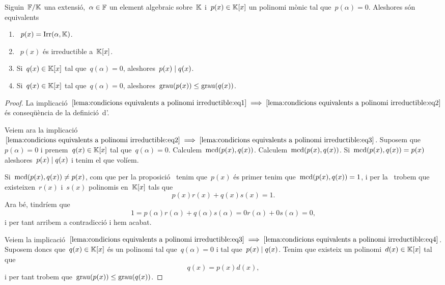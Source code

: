 \documentclass[../../main.tex]{subfiles}
\begin{document}
    \begin{lemma}
        \label{lema:condicions equivalents a polinomi irreductible}
        Siguin~\(\mathbb{F}/\mathbb{K}\) una extensió,~\(\alpha\in\mathbb{F}\) un element algebraic sobre~\(\mathbb{K}\) i~\(p(x)\in\mathbb{K}[x]\) un polinomi mònic tal que~\(p(\alpha)=0\).
        Aleshores són equivalents
        \begin{enumerate}
        \item\label{lema:condicions equivalents a polinomi irreductible:eq1}~\(p(x)=\operatorname{Irr}(\alpha,\mathbb{K})\).
        \item\label{lema:condicions equivalents a polinomi irreductible:eq2}~\(p(x)\) és irreductible a~\(\mathbb{K}[x]\).
        \item\label{lema:condicions equivalents a polinomi irreductible:eq3} Si~\(q(x)\in\mathbb{K}[x]\) tal que~\(q(\alpha)=0\), aleshores~\(p(x)\mathrel{|} q(x)\).
        \item\label{lema:condicions equivalents a polinomi irreductible:eq4} Si~\(q(x)\in\mathbb{K}[x]\) tal que~\(q(\alpha)=0\), aleshores~\(\operatorname{grau}(p(x))\leq\operatorname{grau}(q(x))\).
        \end{enumerate}
        \begin{proof}
            La implicació~\(\eqref{lema:condicions equivalents a polinomi irreductible:eq1}\implies\eqref{lema:condicions equivalents a polinomi irreductible:eq2}\) és conseqüència de la definició~d'.

            Veiem ara la implicació~\(\eqref{lema:condicions equivalents a polinomi irreductible:eq2}\implies\eqref{lema:condicions equivalents a polinomi irreductible:eq3}\).
            Suposem que~\(p(\alpha)=0\) i prenem~\(q(x)\in\mathbb{K}[x]\) tal que~\(q(\alpha)=0\).
            Calculem~\(\operatorname{mcd}(p(x),q(x))\).
            Calculem~\(\operatorname{mcd}(p(x),q(x))\).
            Si~\(\operatorname{mcd}(p(x),q(x))=p(x)\) aleshores~\(p(x)\mathrel{|} q(x)\) i tenim el que volíem.

            Si~\(\operatorname{mcd}(p(x),q(x))\neq p(x)\), com que per la proposició~ tenim que~\(p(x)\) és primer tenim que~\(\operatorname{mcd}(p(x),q(x))=1\), i per la~ trobem que existeixen~\(r(x)\) i~\(s(x)\) polinomis en~\(\mathbb{K}[x]\) tals que
            \[
                p(x)r(x)+q(x)s(x)=1.
            \]
            Ara bé, tindríem que
            \[
                1=p(\alpha)r(\alpha)+q(\alpha)s(\alpha)=0r(\alpha)+0s(\alpha)=0,
            \]
            i per tant arribem a contradicció i hem acabat.

            Veiem la implicació~\(\eqref{lema:condicions equivalents a polinomi irreductible:eq3}\implies\eqref{lema:condicions equivalents a polinomi irreductible:eq4}\).
            Suposem doncs que~\(q(x)\in\mathbb{K}[x]\) és un polinomi tal que~\(q(\alpha)=0\) i tal que~\(p(x)\mathrel{|} q(x)\).
            Tenim que existeix un polinomi~\(d(x)\in\mathbb{K}[x]\) tal que
            \[
                q(x)=p(x)d(x),
            \]
            i per tant trobem que~\(\operatorname{grau}(p(x))\leq\operatorname{grau}(q(x))\).


\end{proof}
\end{lemma}
\end{document}
